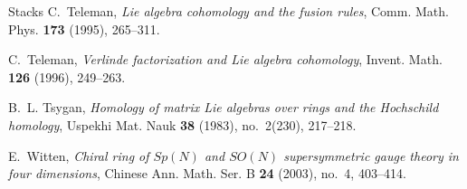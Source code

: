 \documentclass[11pt]{amsart}
\numberwithin{equation}{section}
\theoremstyle{definition}
\theoremstyle{remark}
\begin{document}
\begin{thebibliography}{Stacks}
C.~Teleman, \emph{Lie algebra cohomology and the fusion rules}, Comm. Math. Phys. \textbf{173} (1995), 265--311.

C.~Teleman, \emph{Verlinde factorization and Lie algebra cohomology}, Invent. Math. \textbf{126} (1996), 249--263.

B.~L. Tsygan, \emph{Homology of matrix Lie algebras over rings and the Hochschild homology}, Uspekhi Mat. Nauk \textbf{38} (1983), no.~2(230), 217--218.

E.~Witten, \emph{Chiral ring of {$Sp(N)$} and {$SO(N)$} supersymmetric gauge theory in four dimensions}, Chinese Ann. Math. Ser. B \textbf{24} (2003), no.~4, 403--414.

\end{thebibliography}
\end{document}
